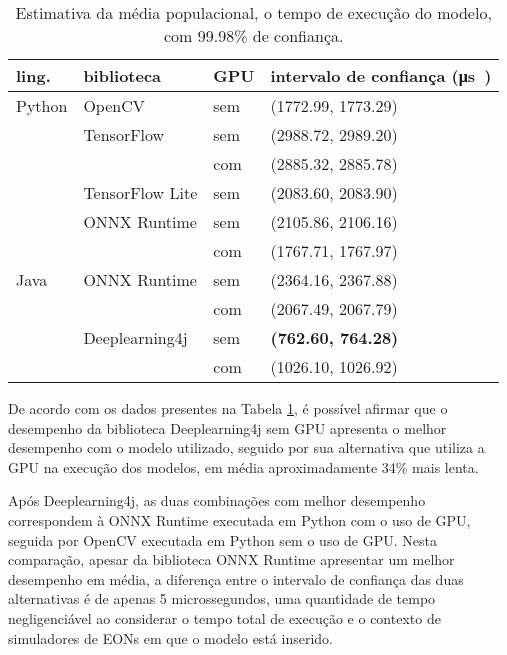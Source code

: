 \begin{table}
    \centering
    \begin{tabular}{llll}
        \toprule
        ling.  & biblioteca      & GPU & intervalo de confiança (\si\micro s) \\
        \midrule
        Python & OpenCV          & sem & (1772.99, 1773.29)                   \\
               & TensorFlow      & sem & (2988.72, 2989.20)                   \\
               &                 & com & (2885.32, 2885.78)                   \\
               & TensorFlow Lite & sem & (2083.60, 2083.90)                   \\
               & ONNX Runtime    & sem & (2105.86, 2106.16)                   \\
               &                 & com & (1767.71, 1767.97)                   \\
        Java   & ONNX Runtime    & sem & (2364.16, 2367.88)                   \\
               &                 & com & (2067.49, 2067.79)                   \\
               & Deeplearning4j  & sem & \textbf{(762.60, 764.28)}            \\
               &                 & com & (1026.10, 1026.92)                   \\

        \bottomrule
    \end{tabular}
    \caption{Estimativa da média populacional, o tempo de execução do modelo, com 99.98\% de confiança.}
    \label{tab:ci}
\end{table}

De acordo com os dados presentes na Tabela \ref{tab:ci}, é possível afirmar que o desempenho da biblioteca Deeplearning4j sem GPU apresenta o melhor desempenho com o modelo utilizado, seguido por sua alternativa que utiliza a GPU na execução dos modelos, em média aproximadamente 34\% mais lenta.

Após Deeplearning4j, as duas combinações com melhor desempenho correspondem à ONNX Runtime executada em Python com o uso de GPU, seguida por OpenCV executada em Python sem o uso de GPU. Nesta comparação, apesar da biblioteca ONNX Runtime apresentar um melhor desempenho em média, a diferença entre o intervalo de confiança das duas alternativas é de apenas 5 microssegundos, uma quantidade de tempo negligenciável ao considerar o tempo total de execução e o contexto de simuladores de EONs em que o modelo está inserido.


